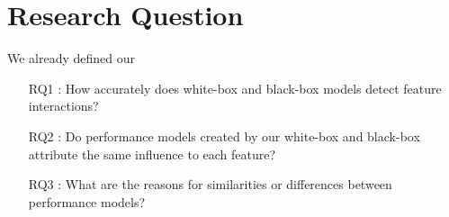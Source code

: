 \section{Research Question}\label{sc:research-Question}

We already defined our \

\begin{itemize}\label{researchQuestions}
    \item[RQ1]: How accurately does white-box and black-box models detect feature interactions? 
    \item[RQ2]: Do performance models created by our white-box and black-box attribute the same influence to each feature?
    \item[RQ3]: What are the reasons for similarities or differences between performance models?
    \end{itemize}
